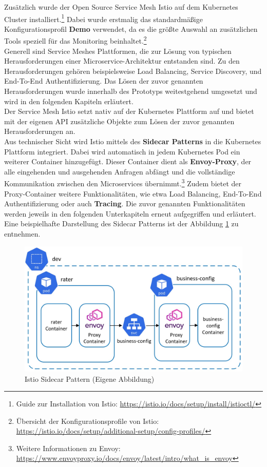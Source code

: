 \newpage
Zusätzlich wurde der Open Source Service Mesh Istio auf dem Kubernetes Cluster installiert.\footnote{Guide zur Installation von Istio: \url{https://istio.io/docs/setup/install/istioctl/}} Dabei wurde erstmalig das standardmäßige Konfigurationsprofil \textbf{Demo} verwendet, da es die größte Auswahl an zusätzlichen Tools speziell für das Monitoring beinhaltet.\footnote{Übersicht der Konfigurationsprofile von Istio: \url{https://istio.io/docs/setup/additional-setup/config-profiles/}}\\ 
Generell sind Service Meshes Plattformen, die zur Lösung von typischen Herausforderungen einer Microservice-Architektur entstanden sind. Zu den Herausforderungen gehören beispielsweise Load Balancing, Service Discovery, und End-To-End Authentifizierung. Das Lösen der zuvor genannten Herausforderungen wurde innerhalb des Prototyps weitestgehend umgesetzt und wird in den folgenden Kapiteln erläutert.\\   
Der Service Mesh Istio setzt nativ auf der Kubernetes Plattform auf und bietet mit der eigenen \ac{API} zusätzliche Objekte zum Lösen der zuvor genannten Herausforderungen an.\autocite[Vgl.][]{IstioAuthors.2019b}
\\
Aus technischer Sicht wird Istio mittels des \textbf{Sidecar Patterns} in die Kubernetes Plattform integriert. Dabei wird automatisch in jedem Kubernetes Pod ein weiterer Container hinzugefügt. Dieser Container dient als \textbf{Envoy-Proxy}, der alle eingehenden und ausgehenden Anfragen abfängt und die vollständige Kommunikation zwischen den Microservices übernimmt.\footnote{Weitere Informationen zu Envoy: \url{https://www.envoyproxy.io/docs/envoy/latest/intro/what_is_envoy}} Zudem bietet der Proxy-Container weitere Funktionalitäten, wie etwa Load Balancing, End-To-End Authentifizierung oder auch \textbf{Tracing}.\autocite[Vgl.][S. 82-83]{Sharma.2020} Die zuvor genannten Funktionalitäten werden jeweils in den folgenden Unterkapiteln erneut aufgegriffen und erläutert.
Eine beispielhafte Darstellung des Sidecar Patterns ist der Abbildung \ref{sidecar_pattern} zu entnehmen.
\begin{figure}[h]
	\begin{center}
		\includegraphics[width=13cm]{img/Sidecar_Pattern.JPG}
		\caption[Istio Sidecar Pattern]{Istio Sidecar Pattern (Eigene Abbildung)}
		\label{sidecar_pattern}
	\end{center}
\end{figure}
\newpage

